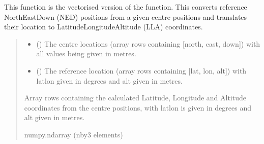 \documentclass[letterpaper,10pt,english]{sphinxmanual}
\begin{document}

\begin{fulllineitems}
\label{\detokenize{modules/util/transformations:qnav.util.transformations.ned2lla_vec}}
\pysigstartsignatures
{}
\pysigstopsignatures
\sphinxAtStartPar
This function is the vectorised version of the
{\hyperref[\detokenize{modules/util/transformations:qnav.util.transformations.ned2lla}]{}} function. This
converts reference North\sphinxhyphen{}East\sphinxhyphen{}Down (NED) positions from a given centre
positions and translates their location to Latitude\sphinxhyphen{}Longitude\sphinxhyphen{}Altitude
(LLA) coordinates.
\begin{quote}\begin{description}
\begin{itemize}
\item {} 
\sphinxAtStartPar
{} (\sphinxstyleliteralemphasis{\sphinxupquote{ (}}\sphinxstyleliteralemphasis{\sphinxupquote{)}}) \textendash{} The centre locations (array rows containing
{[}north, east, down{]}) with all values being given in metres.

\item {} 
\sphinxAtStartPar
{} (\sphinxstyleliteralemphasis{\sphinxupquote{ (}}\sphinxstyleliteralemphasis{\sphinxupquote{)}}) \textendash{} The reference location (array rows containing
{[}lat, lon, alt{]}) with lat\sphinxhyphen{}lon given in degrees and alt given in
metres.

\end{itemize}

\sphinxAtStartPar
Array rows containing the calculated Latitude, Longitude and
Altitude coordinates from the centre positions, with lat\sphinxhyphen{}lon is given
in degrees and alt given in metres.

\sphinxAtStartPar
numpy.ndarray (n\sphinxhyphen{}by\sphinxhyphen{}3 elements)

\end{description}\end{quote}

\end{fulllineitems}
\end{document}
